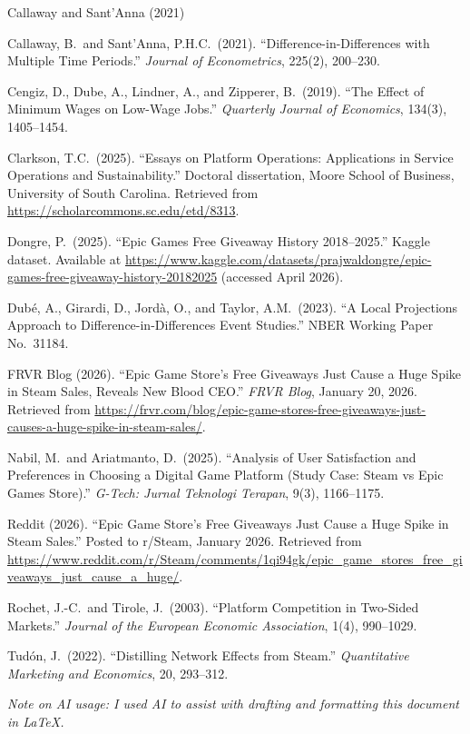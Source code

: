 \documentclass[11pt]{article}
\begin{document}
\clearpage

\begin{singlespace}
\begin{thebibliography}{Callaway and Sant'Anna (2021)}
\setlength{\itemsep}{0.8em}

Callaway, B.\ and Sant'Anna, P.H.C.\ (2021).
``Difference-in-Differences with Multiple Time Periods.''
\textit{Journal of Econometrics}, 225(2), 200--230.

Cengiz, D., Dube, A., Lindner, A., and Zipperer, B.\ (2019).
``The Effect of Minimum Wages on Low-Wage Jobs.''
\textit{Quarterly Journal of Economics}, 134(3), 1405--1454.

Clarkson, T.C.\ (2025).
``Essays on Platform Operations: Applications in Service Operations and Sustainability.''
Doctoral dissertation, Moore School of Business, University of South Carolina.
Retrieved from \url{https://scholarcommons.sc.edu/etd/8313}.

Dongre, P.\ (2025).
``Epic Games Free Giveaway History 2018--2025.''
Kaggle dataset. Available at
\url{https://www.kaggle.com/datasets/prajwaldongre/epic-games-free-giveaway-history-20182025}
(accessed April 2026).

Dub\'{e}, A., Girardi, D., Jord\`{a}, O., and Taylor, A.M.\ (2023).
``A Local Projections Approach to Difference-in-Differences Event Studies.''
NBER Working Paper No.\ 31184.

FRVR Blog (2026).
``Epic Game Store's Free Giveaways Just Cause a Huge Spike in Steam Sales,
Reveals New Blood CEO.''
\textit{FRVR Blog}, January 20, 2026.
Retrieved from \url{https://frvr.com/blog/epic-game-stores-free-giveaways-just-causes-a-huge-spike-in-steam-sales/}.

Nabil, M.\ and Ariatmanto, D.\ (2025).
``Analysis of User Satisfaction and Preferences in Choosing a Digital Game Platform
(Study Case: Steam vs Epic Games Store).''
\textit{G-Tech: Jurnal Teknologi Terapan}, 9(3), 1166--1175.

Reddit (2026).
``Epic Game Store's Free Giveaways Just Cause a Huge Spike in Steam Sales.''
Posted to r/Steam, January 2026. Retrieved from
\url{https://www.reddit.com/r/Steam/comments/1qi94gk/epic_game_stores_free_giveaways_just_cause_a_huge/}.

Rochet, J.-C.\ and Tirole, J.\ (2003).
``Platform Competition in Two-Sided Markets.''
\textit{Journal of the European Economic Association}, 1(4), 990--1029.

Tud\'on, J.\ (2022).
``Distilling Network Effects from Steam.''
\textit{Quantitative Marketing and Economics}, 20, 293--312.

\end{thebibliography}
\end{singlespace}

\vspace{1em}
\noindent\textit{Note on AI usage: I used AI to assist with drafting and formatting this
document in \LaTeX.}
\end{document}
